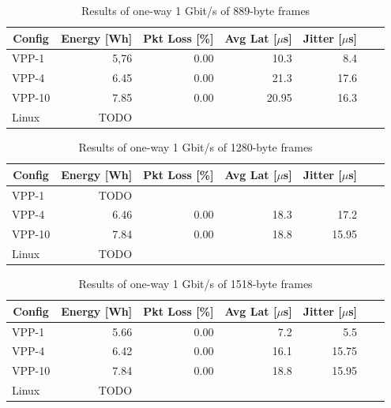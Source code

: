 \begin{table}[h!]
\centering
\caption{Results of one-way 1 Gbit/s of 889-byte frames}
\begin{tabular}{|l|r|r|r|r|r|r|}
\hline
\multicolumn{1}{|c|}{\textbf{Config}} &
\multicolumn{1}{c|}{\textbf{Energy [Wh] }} &
\multicolumn{1}{c|}{\textbf{Pkt Loss [\%]}} &
\multicolumn{1}{c|}{\textbf{Avg Lat [$\mu$s]}} &
\multicolumn{1}{c|}{\textbf{Jitter [$\mu$s]}} \\
\hline 
VPP-1 & 5,76 & 0.00 & 10.3 & 8.4 \\
VPP-4 & 6.45 & 0.00 & 21.3 & 17.6 \\
VPP-10 & 7.85 & 0.00 & 20.95 & 16.3  \\
Linux & TODO &  &  &  \\
\hline
\end{tabular}
\label{tab:1udp:889B}
\end{table}


\begin{table}[h!]
\centering
\caption{Results of one-way 1 Gbit/s of 1280-byte frames}
\begin{tabular}{|l|r|r|r|r|r|r|}
\hline
\multicolumn{1}{|c|}{\textbf{Config}} &
\multicolumn{1}{c|}{\textbf{Energy [Wh] }} &
\multicolumn{1}{c|}{\textbf{Pkt Loss [\%]}} &
\multicolumn{1}{c|}{\textbf{Avg Lat [$\mu$s]}} &
\multicolumn{1}{c|}{\textbf{Jitter [$\mu$s]}} \\
\hline 
VPP-1 & TODO &  &  &  \\
VPP-4 & 6.46 & 0.00 & 18.3 & 17.2 \\
VPP-10 & 7.84 & 0.00 & 18.8 & 15.95  \\
Linux & TODO &  &  &  \\
\hline
\end{tabular}
\label{tab:1udp:1280B}
\end{table}


\begin{table}[h!]
\centering
\caption{Results of one-way 1 Gbit/s of 1518-byte frames}
\begin{tabular}{|l|r|r|r|r|r|r|}
\hline
\multicolumn{1}{|c|}{\textbf{Config}} &
\multicolumn{1}{c|}{\textbf{Energy [Wh] }} &
\multicolumn{1}{c|}{\textbf{Pkt Loss [\%]}} &
\multicolumn{1}{c|}{\textbf{Avg Lat [$\mu$s]}} &
\multicolumn{1}{c|}{\textbf{Jitter [$\mu$s]}} \\
\hline 
VPP-1 & 5.66 & 0.00 & 7.2 & 5.5  \\
VPP-4 & 6.42 & 0.00 & 16.1 & 15.75 \\
VPP-10 & 7.84 & 0.00 & 18.8 & 15.95 \\
Linux & TODO &  &  &  \\
\hline
\end{tabular}
\label{tab:1udp:1518B}
\end{table}

